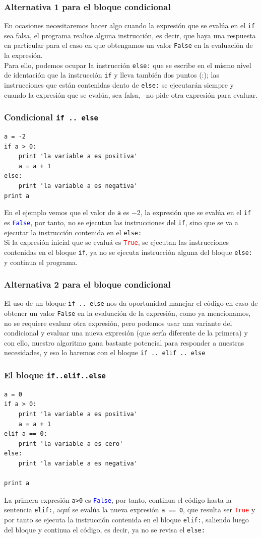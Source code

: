 \begin{frame}
\frametitle{Alternativa 1 para el bloque condicional}
En ocasiones necesitaremos hacer algo cuando la expresión que se evalúa en el \texttt{if} sea falsa, el programa realice alguna instrucción, es decir, que haya una respuesta en particular para el caso en que obtengamos un valor \texttt{False} en la evaluación de la expresión.
\\
\medskip
Para ello, podemos ocupar la instrucción \texttt{else:} que se escribe en el mismo nivel de identación que la instrucción \texttt{if} y lleva también dos puntos (:); las instrucciones que están contenidas dento de \texttt{else:} se ejecutarán siempre y cuando la expresión que se evalúa, sea falsa, \python\ no pide otra expresión para evaluar.
\end{frame}
\begin{frame}[fragile]
\frametitle{Condicional \texttt{if .. else}}
\begin{lstlisting}
a = -2
if a > 0:
    print 'la variable a es positiva'
    a = a + 1
else:
	print 'la variable a es negativa'
print a
\end{lstlisting}
\fontsize{12}{12}\selectfont
En el ejemplo vemos que el valor de \texttt{a} es $-2$, la expresión que se evalúa en el \texttt{if} es \textcolor{blue}{\texttt{False}}, por tanto, no se ejecutan las instrucciones del \texttt{if}, sino que se va a ejecutar la instrucción contenida en el \texttt{else:}
\\
\medskip
Si la expresión inicial que se evaluá es \textcolor{red}{\texttt{True}}, se ejecutan las instrucciones contenidas en el bloque \texttt{if}, ya no se ejecuta instrucción alguna del bloque \texttt{else:} y continua el programa.
\end{frame}
\begin{frame}
\frametitle{Alternativa 2 para el bloque condicional}
El uso de un bloque \texttt{if .. else} nos da oportunidad manejar el código en caso de obtener un valor \texttt{False} en la evaluación de la expresión, como ya mencionamos, no se requiere evaluar otra expresión, pero podemos usar una variante del condicional y evaluar una nueva expresión (que sería diferente de la primera) y con ello, nuestro algoritmo gana bastante potencial para responder a nuestras necesidades, y eso lo haremos con el bloque \texttt{if .. elif .. else}
\end{frame}
\begin{frame}[fragile]
\frametitle{El bloque \texttt{if..elif..else}}
\begin{lstlisting}
a = 0
if a > 0:
    print 'la variable a es positiva'
    a = a + 1
elif a == 0:
    print 'la variable a es cero'
else:
    print 'la variable a es negativa'

print a
\end{lstlisting}
\fontsize{12}{12}\selectfont
La primera expresión \texttt{a>0} es \textcolor{blue}{\texttt{False}}, por tanto, continua el código hasta la sentencia \texttt{elif:}, aquí se evalúa la nueva expresión \texttt{a == 0}, que resulta ser \textcolor{red}{\texttt{True}} y por tanto se ejecuta la instrucción contenida en el bloque \texttt{elif:}, saliendo luego del bloque y continua el código, es decir, ya no se revisa el \texttt{else:}
\end{frame}
